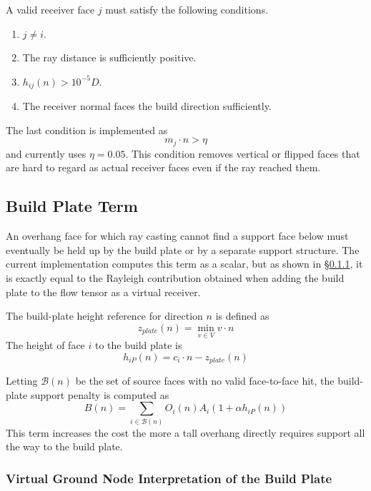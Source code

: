 \documentclass[11pt,a4paper]{article}
\begin{document}
A valid receiver face $j$ must satisfy the following conditions.

\begin{enumerate}
\item $j\ne i$.
\item The ray distance is sufficiently positive.
\item $h_{ij}(n)>10^{-5}D$.
\item The receiver normal faces the build direction sufficiently.
\end{enumerate}

The last condition is implemented as
\begin{equation}
m_j\cdot n > \eta
\end{equation}
and currently uses $\eta=0.05$.
This condition removes vertical or flipped faces that are hard to regard as actual receiver faces even if the ray reached them.

\subsection{Build Plate Term}

An overhang face for which ray casting cannot find a support face below must eventually be held up by the build plate or by a separate support structure.
The current implementation computes this term as a scalar, but
as shown in \S\ref{sec:groundnode}, it is exactly equal to the Rayleigh contribution obtained when adding the build plate to the flow tensor as a virtual receiver.

The build-plate height reference for direction $n$ is defined as
\begin{equation}
z_{plate}(n)=\min_{v\in V} v\cdot n
\end{equation}
The height of face $i$ to the build plate is
\begin{equation}
h_{iP}(n)=c_i\cdot n-z_{plate}(n)
\end{equation}

Letting $\mathcal{B}(n)$ be the set of source faces with no valid face-to-face hit,
the build-plate support penalty is computed as
\begin{equation}
B(n)
=
\sum_{i\in\mathcal{B}(n)}
O_i(n)A_i\left(1+\alpha h_{iP}(n)\right)
\end{equation}
This term increases the cost the more a tall overhang directly requires support all the way to the build plate.

\subsubsection{Virtual Ground Node Interpretation of the Build Plate}
\label{sec:groundnode}
\end{document}
